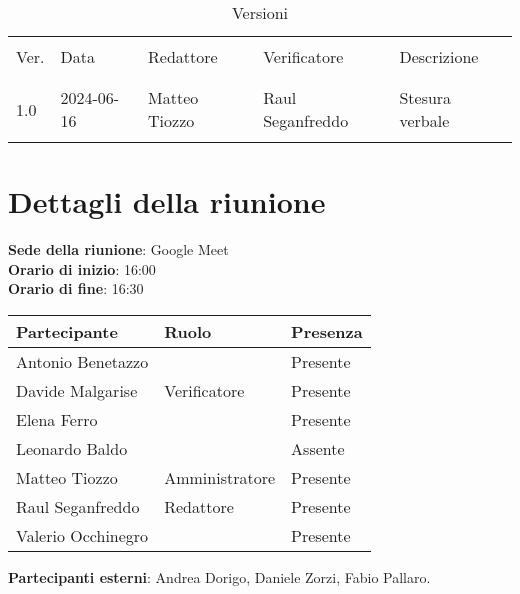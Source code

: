 \documentclass[italian,12pt]{article}
\begin{document}


\newpage



\begin{table}[!h]
	\caption{Versioni}
	\footnotesize
	\begin{center}
		\begin{tabular}{ l l l l p{6cm} }
			\hline                                                                           \\[-2ex]
			Ver. & Data       & Redattore       & Verificatore       & Descrizione           \\
			\\[-2ex] \hline \\[-1.5ex]
			1.0  & 2024-06-16 & Matteo Tiozzo   & Raul Seganfreddo   & Stesura verbale       \\
			\\[-1.5ex] \hline
		\end{tabular}
	\end{center}
\end{table}

\newpage

\tableofcontents

\newpage

\section{Dettagli della riunione}


\textbf{Sede della riunione}: Google Meet\\
\textbf{Orario di inizio}: 16:00\\
\textbf{Orario di fine}: 16:30\\

\begin{flushleft}
	\begin{table}[!h]
		\begin{tabular}{ |l|l|l| }
			\hline
			\textbf{Partecipante} & \textbf{Ruolo} & \textbf{Presenza} \\
			\hline
			Antonio Benetazzo     &                & Presente          \\
			Davide Malgarise      & Verificatore   & Presente          \\
			Elena Ferro           & 			   & Presente          \\
			Leonardo Baldo        & 			   & Assente           \\
			Matteo Tiozzo         & Amministratore & Presente          \\
			Raul Seganfreddo      & Redattore	   & Presente          \\
			Valerio Occhinegro    &                & Presente          \\
			\hline
		\end{tabular}
	\end{table}
	\textbf{Partecipanti esterni}: Andrea Dorigo, Daniele Zorzi, Fabio Pallaro.\\
\end{flushleft}
\end{document}
